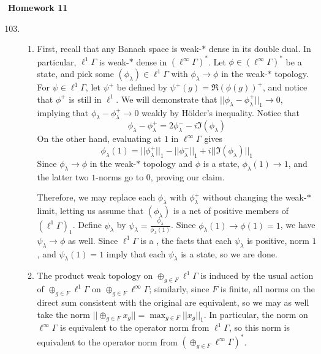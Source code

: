\documentclass[a4paper,10pt]{report}
\newcommand{\pn}[2]{||#1||_{#2}}
\newcommand{\norm}[1]{||#1||}
\begin{document}

\pagestyle{fancy}	
\fancyhf{} %
\setlength{\headheight}{60pt}

\begin{center}
	\textbf{Homework 11}
\end{center}
\begin{enumerate}
		\setcounter{enumi}{102}
	\item
		\begin{enumerate}
			\item First, recall that any Banach space is weak-$*$ dense in its double dual. In particular, $\ell^1\Gamma$ is weak-$*$ dense in $(\ell^\infty\Gamma)^*$. Let $\phi\in(\ell^\infty\Gamma)^*$ be a state, and pick some $(\phi_\lambda)\in\ell^1\Gamma$ with $\phi_\lambda\to\phi$ in the weak-$*$ topology. For $\psi\in\ell^1\Gamma$, let $\psi^+$ be defined by $\psi^+(g)=\Re(\phi(g))^+$, and notice that $\phi^+$ is still in $\ell^1$. We will demonstrate that $\pn{\phi_\lambda-\phi_\lambda^+}{1}\to 0$, implying that $\phi_\lambda-\phi_\lambda^+\to 0$ weakly by {H\"{o}lder's} inequality. Notice that 
				\[\phi_\lambda-\phi_\lambda^+=2\phi_\lambda^--i\Im(\phi_\lambda)\]
				On the other hand, evaluating at $1$ in $\ell^\infty\Gamma$ gives 
				\[\phi_\lambda(1)=\pn{\phi_\lambda^+}{1}-\pn{\phi_\lambda^-}{1}+i\pn{\Im(\phi_\lambda)}{1}\]
				Since $\phi_\lambda\to\phi$ in the weak-$*$ topology and $\phi$ is a state, $\phi_\lambda(1)\to 1$, and the latter two $1$-norms go to $0$, proving our claim. 
				
				Therefore, we may replace each $\phi_\lambda$ with $\phi_\lambda^+$ without changing the weak-$*$ limit, letting us assume that $(\phi_\lambda)$ is a net of positive members of $(\ell^1\Gamma)_1$. Define $\psi_\lambda$ by $\psi_\lambda=\frac{\phi_\lambda}{\phi_\lambda(1)}$. Since $\phi_\lambda(1)\to\phi(1)=1$, we have $\psi_\lambda\to\phi$ as well. Since $\ell^1\Gamma$ is a \csa, the facts that each $\psi_\lambda$ is positive, norm $1$, and $\psi_\lambda(1)=1$ imply that each $\psi_\lambda$ is a state, so we are done. 
			\item The product weak topology on $\oplus_{g\in F}\ell^1\Gamma$ is induced by the usual action of $\oplus_{g\in F}\ell^1\Gamma$ on $\oplus_{g\in F}\ell^\infty\Gamma$; similarly, since $F$ is finite, all norms on the direct sum consistent with the original are equivalent, so we may as well take the norm $\norm{\oplus_{g\in F}x_g}=\max_{g\in F}\pn{x_g}{1}$. In particular, the norm on $\ell^\infty\Gamma$ is equivalent to the operator norm from $\ell^1\Gamma$, so this norm is equivalent to the operator norm from $(\oplus_{g\in F}\ell^\infty\Gamma)^*$. 
				

\end{enumerate}
\end{enumerate}
\end{document}
